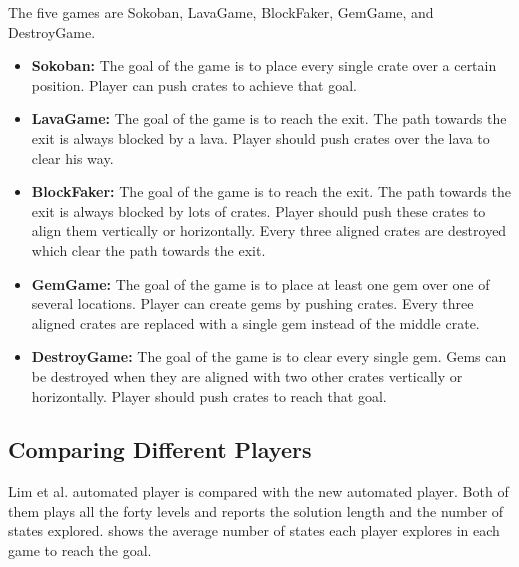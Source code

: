 
The five games are Sokoban, LavaGame, BlockFaker, GemGame, and DestroyGame.
\begin{itemize} \itemsep0pt \parskip0pt 
	\item \textbf{Sokoban:} The goal of the game is to place every single crate over a certain position. Player can push crates to achieve that goal.
	\item \textbf{LavaGame:} The goal of the game is to reach the exit. The path towards the exit is always blocked by a lava. Player should push crates over the lava to clear his way.
	\item \textbf{BlockFaker:} The goal of the game is to reach the exit. The path towards the exit is always blocked by lots of crates. Player should push these crates to align them vertically or horizontally. Every three aligned crates are destroyed which clear the path towards the exit.
	\item \textbf{GemGame:} The goal of the game is to place at least one gem over one of several locations. Player can create gems by pushing crates. Every three aligned crates are replaced with a single gem instead of the middle crate.
	\item \textbf{DestroyGame:} The goal of the game is to clear every single gem. Gems can be destroyed when they are aligned with two other crates vertically or horizontally. Player should push crates to reach that goal.
\end{itemize}

\subsection{Comparing Different Players}
Lim et al.\cite{puzzleScriptGeneration} automated player is compared with the new automated player. Both of them plays all the forty levels and reports the solution length and the number of states explored.  shows the average number of states each player explores in each game to reach the goal.


